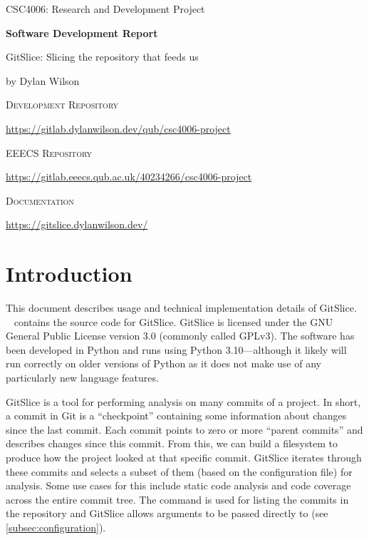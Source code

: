 \documentclass[11pt]{article}
\begin{document}
    \begin{titlepage}
        \begin{center}
            \Large
            CSC4006: Research and Development Project

            \vfill
            \Huge
            \textbf{Software Development Report}

            \medskip
            \Large
            GitSlice: Slicing the repository that feeds us

            \medskip
            by Dylan Wilson

            \vfill
            \normalsize
            \textsc{Development Repository}

            \url{https://gitlab.dylanwilson.dev/qub/csc4006-project}

            \medskip
            \textsc{EEECS Repository}

            \url{https://gitlab.eeecs.qub.ac.uk/40234266/csc4006-project}

            \medskip
            \textsc{Documentation}

            \url{https://gitslice.dylanwilson.dev/}
        \end{center}
    \end{titlepage}

    \tableofcontents

    \section{Introduction}
    \label{sec:introduction}

    This document describes usage and technical implementation details of GitSlice.
    ~\cite{gitlab} contains the source code for GitSlice.
    GitSlice is licensed under the GNU General Public License version 3.0 (commonly called GPLv3).
    The software has been developed in Python and runs using Python 3.10---although it likely will run correctly on older versions of Python as it does not make use of any particularly new language features.

    GitSlice is a tool for performing analysis on many commits of a project.
    In short, a commit in Git is a ``checkpoint'' containing some information about changes since the last commit.
    Each commit points to zero or more ``parent commits'' and describes changes since this commit.
    From this, we can build a filesystem to produce how the project looked at that specific commit.
    GitSlice iterates through these commits and selects a subset of them (based on the configuration file) for analysis.
    Some use cases for this include static code analysis and code coverage across the entire commit tree.
    The  command is used for listing the commits in the repository and GitSlice allows arguments to be passed directly to  (see \autoref{subsec:configuration}).
\end{document}
